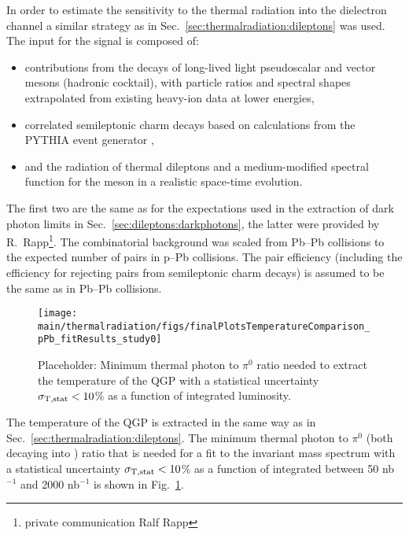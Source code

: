 \documentclass[../report.tex]{subfiles}
\providecommand{\main}{..}
\begin{document}
In order to estimate the sensitivity to the thermal radiation into the dielectron channel a similar strategy as in Sec.~\ref{sec:thermalradiation:dileptons} was used. 
The input for the signal is composed of:
\begin{itemize}
\item contributions from the decays of long-lived light pseudoscalar and vector mesons (hadronic cocktail), with particle ratios and spectral shapes extrapolated from existing heavy-ion data at lower energies,
\item correlated semileptonic charm decays based on calculations from the PYTHIA event generator \cite{}, 
\item and the radiation of thermal dileptons and a medium-modified spectral function for the \Prho meson in a realistic space-time evolution.
\end{itemize}
The first two are the same as for the expectations used in the extraction of dark photon limits in Sec.~\ref{sec:dileptons:darkphotons}, the latter were provided by R.~Rapp\footnote{private communication Ralf Rapp}. The combinatorial background was scaled from Pb--Pb collisions to the expected number of pairs in p--Pb collisions. The pair efficiency (including the efficiency for rejecting \Pepem pairs from semileptonic charm decays) is assumed to be the same as in Pb--Pb collisions. 

\begin{figure}[htb]
\centering
\texttt{[image: \\main/thermalradiation/figs/finalPlotsTemperatureComparison\_pPb\_fitResults\_study0]}
\caption{Placeholder: Minimum thermal photon to $\pi^{0}$ ratio needed to extract the temperature of the QGP with a statistical uncertainty $\sigma_{\rm T,stat} < 10$\% as a function of integrated luminosity.}
\label{fig:SignalScalingVsLumi_Rapp_pPb}
\end{figure}

The temperature of the QGP is extracted in the same way as in Sec.~\ref{sec:thermalradiation:dileptons}. The minimum thermal photon to $\pi^{0}$ (both decaying into \Pepem) ratio that is needed for a fit to the invariant mass spectrum with a statistical uncertainty $\sigma_{\rm T,stat} < 10$\% as a function of integrated between 50 nb$^{-1}$ and 2000 nb$^{-1}$ is shown in Fig.~\ref{fig:SignalScalingVsLumi_Rapp_pPb}. 
\end{document}
